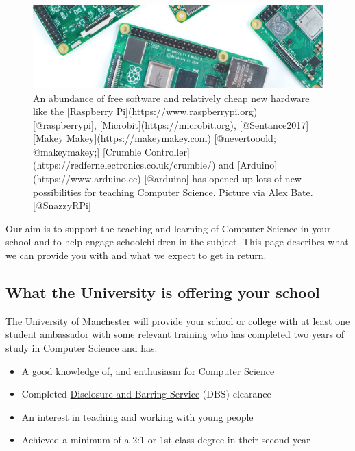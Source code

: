\documentclass[
  12pt,
]{book}
\providecommand{\tightlist}{%
  \setlength{\itemsep}{0pt}\setlength{\parskip}{0pt}}
\begin{document}
\begin{figure}

{\centering \includegraphics[width=1\linewidth]{images/raspberrypi} 

}

\caption{An abundance of free software and relatively cheap new hardware like the [Raspberry Pi](https://www.raspberrypi.org) [@raspberrypi], [Microbit](https://microbit.org), [@Sentance2017] [Makey Makey](https://makeymakey.com) [@nevertooold; @makeymakey;] [Crumble Controller](https://redfernelectronics.co.uk/crumble/) and [Arduino](https://www.arduino.cc) [@arduino] has opened up lots of new possibilities for teaching Computer Science. Picture via Alex Bate. [@SnazzyRPi]}\label{fig:unnamed-chunk-7}
\end{figure}

Our aim is to support the teaching and learning of Computer Science in your school and to help engage schoolchildren in the subject. This page describes what we can provide you with and what we expect to get in return.

\hypertarget{what-the-university-is-offering-your-school}{%
\subsection{What the University is offering your school}\label{what-the-university-is-offering-your-school}}

The University of Manchester will provide your school or college with at least one student ambassador with some relevant training who has completed two years of study in Computer Science and has:

\begin{itemize}
\tightlist
\item
  A good knowledge of, and enthusiasm for Computer Science
\item
  Completed \href{https://www.gov.uk/government/organisations/disclosure-and-barring-service}{Disclosure and Barring Service} (DBS) clearance
\item
  An interest in teaching and working with young people
\item
  Achieved a minimum of a 2:1 or 1st class degree in their second year
\end{itemize}
\end{document}
